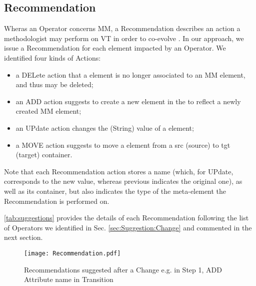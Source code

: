 \subsection{Recommendation}
\label{sec:Suggestion:Recommendation}

Wheras an \textsf{Operator} concerns \textsf{MM}, a \textsf{Recommendation} 
describes an action a methodologist may perform on \textsf{VT} in order to
co-evolve \viewtypes. 
In our approach, we issue a \textsf{Recommendation} for each \viewtype element 
impacted by an \textsf{Operator}. We identified four kinds of \textsf{Action}s: 
\begin{itemize}
	\item a \textsf{DEL}ete action that a \viewtype element is no longer associated
	to an \textsf{MM} element, and thus may be deleted;
	\item an \textsf{ADD} action suggests to create a new element in the \viewtype
	to reflect a newly created \textsf{MM} element;
	\item an \textsf{UP}date action changes the (String) value of a \viewtype element;
	\item a \textsf{MOVE} action suggests to move a \viewtype element from a \textsf{src}
	(source) to \textsf{tgt} (target) container.
\end{itemize}
Note that each \textsf{Recommendation} action stores a \textsf{name} (which, for
\textsf{UP}date, corresponds to the new value, whereas \textsf{previous} 
indicates the original one), as well as its \textsf{container}, but also 
indicates the \textsf{type} of the \viewtype meta-element the 
\textsf{Recommendation} is performed on.

\autoref{tab:suggestions} provides the details of each \textsf{Recommendation} 
following the list of \textsf{Operator}s we identified in Sec. 
\ref{sec:Suggestion:Change} and commented in the next section.

\begin{figure}[t]
    \centering
    \texttt{[image: Recommendation.pdf]}
    \caption{\textsf{Recommendation}s suggested after a \textsf{Change}
    e.g. in Step 1, \textsf{ADD} Attribute \textsf{name} in \textsf{Transition} }
    \label{fig:Recommendation}
\end{figure}